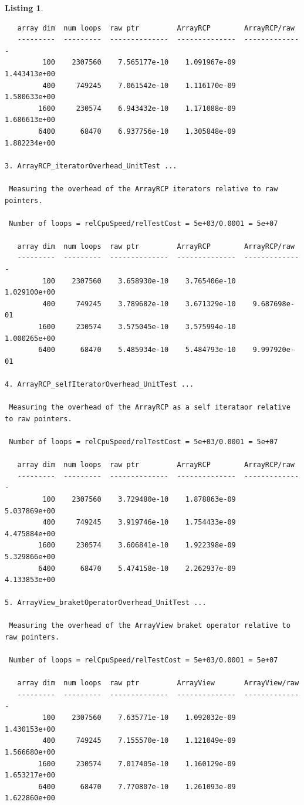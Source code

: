\documentclass[pdf,ps2pdf,11pt]{SANDreport}
\newtheorem{listing}{Listing}
\begin{document}
\begin{listing}
{\begin{verbatim}
   array dim  num loops  raw ptr         ArrayRCP        ArrayRCP/raw  
   ---------  ---------  --------------  --------------  --------------
         100    2307560    7.565177e-10    1.091967e-09    1.443413e+00
         400     749245    7.061542e-10    1.116170e-09    1.580633e+00
        1600     230574    6.943432e-10    1.171088e-09    1.686613e+00
        6400      68470    6.937756e-10    1.305848e-09    1.882234e+00

3. ArrayRCP_iteratorOverhead_UnitTest ... 
 
 Measuring the overhead of the ArrayRCP iterators relative to raw pointers.
 
 Number of loops = relCpuSpeed/relTestCost = 5e+03/0.0001 = 5e+07
 
   array dim  num loops  raw ptr         ArrayRCP        ArrayRCP/raw  
   ---------  ---------  --------------  --------------  --------------
         100    2307560    3.658930e-10    3.765406e-10    1.029100e+00
         400     749245    3.789682e-10    3.671329e-10    9.687698e-01
        1600     230574    3.575045e-10    3.575994e-10    1.000265e+00
        6400      68470    5.485934e-10    5.484793e-10    9.997920e-01

4. ArrayRCP_selfIteratorOverhead_UnitTest ... 
 
 Measuring the overhead of the ArrayRCP as a self iterataor relative to raw pointers.
 
 Number of loops = relCpuSpeed/relTestCost = 5e+03/0.0001 = 5e+07
 
   array dim  num loops  raw ptr         ArrayRCP        ArrayRCP/raw  
   ---------  ---------  --------------  --------------  --------------
         100    2307560    3.729480e-10    1.878863e-09    5.037869e+00
         400     749245    3.919746e-10    1.754433e-09    4.475884e+00
        1600     230574    3.606841e-10    1.922398e-09    5.329866e+00
        6400      68470    5.474158e-10    2.262937e-09    4.133853e+00

5. ArrayView_braketOperatorOverhead_UnitTest ... 
 
 Measuring the overhead of the ArrayView braket operator relative to raw pointers.
 
 Number of loops = relCpuSpeed/relTestCost = 5e+03/0.0001 = 5e+07
 
   array dim  num loops  raw ptr         ArrayView       ArrayView/raw 
   ---------  ---------  --------------  --------------  --------------
         100    2307560    7.635771e-10    1.092032e-09    1.430153e+00
         400     749245    7.155570e-10    1.121049e-09    1.566680e+00
        1600     230574    7.017405e-10    1.160129e-09    1.653217e+00
        6400      68470    7.770807e-10    1.261093e-09    1.622860e+00


\end{verbatim}}
\end{listing}
\end{document}
